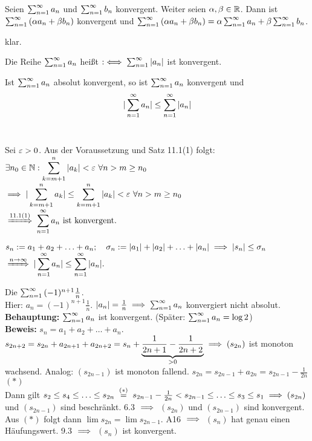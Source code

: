 \documentclass[a4paper,twoside,DIV15,BCOR12mm]{scrbook}
\begin{document}
\begin{satz}
Seien $\sum_{n=1}^{\infty}{a_n}$ und $\sum_{n=1}^{\infty}{b_n}$ konvergent. Weiter seien $\alpha,\beta \in \mathbb{R}$. Dann ist $\sum_{n=1}^{\infty}{(\alpha a_n+\beta b_n)}$ konvergent und $\sum_{n=1}^{\infty}{(\alpha a_n+\beta b_n)} = \alpha\sum_{n=1}^{\infty}{a_n}+\beta\sum_{n=1}^{\infty}{b_n}$.
\end{satz}

\begin{beweis}
klar.
\end{beweis}

\begin{definition}
Die Reihe $\sum_{n=1}^{\infty}{a_n}$ heißt  $:\iff \sum_{n=1}^{\infty}{|a_n|}$ ist konvergent. 
\end{definition}

\begin{satz}
Ist $\sum_{n=1}^{\infty}{a_n}$ absolut konvergent, so ist $\sum_{n=1}^{\infty}{a_n}$ konvergent und
$$|\sum_{n=1}^{\infty}{a_n}| \le \sum_{n=1}^{\infty}{|a_n|}$$
\ 
\end{satz}

\begin{beweis}
Sei $\varepsilon > 0$. Aus der Voraussetzung und Satz 11.1(1) folgt:\\
$\displaystyle{\exists n_0\in\ensuremath{\mathbb{N}}: \sum_{k=m+1}^{n}{|a_k|} < \varepsilon\ \forall n>m \ge n_0}$\\
$\displaystyle{\ensuremath{\implies}|\sum_{k=m+1}^{n}{a_k}| \le \sum_{k=m+1}^{n}{|a_k|} < \varepsilon\ \forall n>m \ge n_0}$\\
$\displaystyle{\folgtnach{11.1(1)} \areihe \text{ ist konvergent.}}$

$\displaystyle{s_n := a_1+a_2+\ldots+a_n;\quad\sigma_n := |a_1|+|a_2|+\ldots+|a_n| \ensuremath{\implies}|s_n|\le\sigma_n}$\\
$\displaystyle{\folgtwegen{n\to\infty} |\areihe| \le \reihe{|a_n|}}.$
\end{beweis}

\begin{beispiel}
Die  $\sum_{n=1}^{\infty}{(-1)^{n+1} \frac{1}n}$.\\
Hier: $a_n = (-1)^{n+1}\frac{1}{n}$. $|a_n| = \frac{1}{n} \implies \sum_{n=1}^{\infty}{a_n}$ konvergiert nicht absolut.\\
\textbf{Behauptung:} $\sum_{n=1}^{\infty}{a_n}$ ist konvergent. (Später: $\sum_{n=1}^{\infty}{a_n} = \log 2$)\\
\textbf{Beweis:} $s_n = a_1 + a_2 + \ldots + a_n$. $s_{2n+2} = s_{2n} + a_{2n+1} + a_{2n+2} = s_n + \underbrace{\frac{1}{2n+1} - \frac{1}{2n+2}}_{>0} \implies (s_{2n})$ ist monoton wachsend. Analog: $(s_{2n-1})$ ist monoton fallend. 
$s_{2n} = s_{2n-1} + a_{2n} = s_{2n-1} - \frac{1}{2n}$ $(*)$\\
Dann gilt $s_2 \le s_4 \le \ldots \le s_{2n} \gleichwegen{(*)} s_{2n-1} - \frac{1}{2n} < s_{2n-1} \le \ldots \le s_3 \le s_1 \folgt (s_{2n})$ und $(s_{2n-1})$ sind beschränkt. 6.3 $\implies$ $(s_{2n})$ und $(s_{2n-1})$ sind konvergent. Aus $(*)$ folgt dann $\lim s_{2n} = \lim s_{2n-1}$. A16 $\implies$ $(s_n)$ hat genau einen Häufungswert. 9.3 $\implies$ $(s_n)$ ist konvergent.
\end{beispiel}
\end{document}
